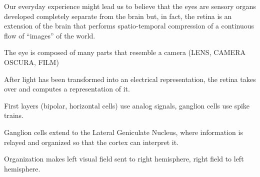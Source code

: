 Our everyday experience might lead us to believe that the eyes are sensory organs developed completely separate from the brain but, in fact, the retina is an extension of the brain that performs spatio-temporal compression of a continuous flow of ``images'' of the world.

The eye is composed of many parts that resemble a camera (LENS, CAMERA OSCURA, FILM)

After light has been transformed into an electrical representation, the retina takes over and computes a representation of it.

First layers (bipolar, horizontal cells) use analog signals, ganglion cells use spike trains.

Ganglion cells extend to the Lateral Geniculate Nucleus, where information is relayed and organized so that the cortex can interpret it. 

Organization makes left visual field sent to right hemisphere, right field to left hemisphere.

